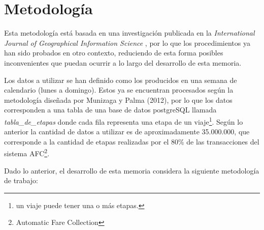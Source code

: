 \documentclass[12pt]{article}
\begin{document}
    \newpage
    \section{Metodología}


    Esta metodología está basada en una investigación publicada en la \textit{International Journal of Geographical Information Science} \cite{Estructura_urbana}, por lo que los procedimientos ya han sido probados en otro contexto, reduciendo de esta forma posibles inconvenientes que puedan ocurrir a lo largo del desarrollo de esta memoria. 

    Los datos a utilizar se han definido como los producidos en una semana de calendario (lunes a domingo). Estos ya se encuentran procesados según la metodología diseñada por Munizaga y Palma (2012)\cite{Procesamiento_datos}, por lo que los datos corresponden a una tabla de una base de datos postgreSQL llamada \textit{tabla\_de\_etapas} donde cada fila representa una etapa de un viaje\footnote{un viaje puede tener una o más etapas.}. Según lo anterior la cantidad de datos a utilizar es de aproximadamente 35.000.000, que corresponde a la cantidad de etapas realizadas por el 80\% de las transacciones del sistema AFC\footnote{Automatic Fare Collection}.

    Dado lo anterior, el desarrollo de esta memoria considera la siguiente metodología de trabajo:
\end{document}
